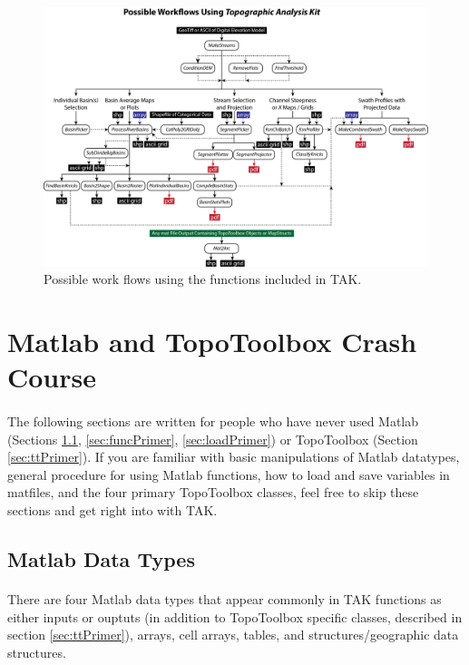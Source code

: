 \begin{figure}[H]
	\includegraphics[width=16.5cm]{PNGs/FlowChart.png}
	\caption{Possible work flows using the functions included in TAK.}
	\label{fig:Workflow}
\end{figure}

\section{Matlab and TopoToolbox Crash Course} \label{sec:primer}
\paragraph{}The following sections are written for people who have never used Matlab (Sections \ref{sec:dataPrimer}, \ref{sec:funcPrimer}, \ref{sec:loadPrimer}) or TopoToolbox (Section \ref{sec:ttPrimer}). If you are familiar with basic manipulations of Matlab datatypes,  general procedure for using Matlab functions, how to load and save variables in matfiles, and the four primary TopoToolbox classes, feel free to skip these sections and get right into  with TAK.

\subsection{Matlab Data Types} \label{sec:dataPrimer}
\paragraph{}There are four Matlab data types that appear commonly in TAK functions as either inputs or ouptuts (in addition to TopoToolbox specific classes, described in section \ref{sec:ttPrimer}), arrays, cell arrays, tables, and structures/geographic data structures.

